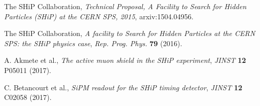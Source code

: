 \documentclass[a4paper,11pt]{article}
\begin{document}
\begin{thebibliography}{99}

The SHiP Collaboration, \emph{Technical Proposal, A Facility to Search for Hidden Particles (SHiP) at the CERN SPS, 2015},
arxiv:1504.04956.

The SHiP Collaboration, \emph{A facility to Search for Hidden Particles at the CERN SPS: the SHiP physics case}, \emph{Rep. Prog. Phys.} {\bf 79} (2016).

A. Akmete et al., \emph{The active muon shield in the SHiP experiment}, \emph{JINST} {\bf 12} P05011 (2017).

C. Betancourt et al., \emph{SiPM readout for the SHiP timing detector}, \emph{JINST} {\bf 12} C02058 (2017).



\end{thebibliography}
\end{document}
